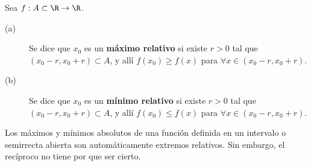 \begin{fdefinition}
\normalfont Sea $\displaystyle f : A \subset \R \to \R $. 
\begin{description}
\item[(a)] Se dice que $\displaystyle x_{0} $ es un \textbf{máximo relativo} si existe $\displaystyle r > 0 $ tal que $\displaystyle \left(x_{0}-r, x_{0}+r\right) \subset A $, y allí $\displaystyle f\left(x_{0}\right) \geq f\left(x\right) $ para $\displaystyle \forall x \in \left(x_{0}-r, x_{0}+r\right) $.
\item[(b)] Se dice que $\displaystyle x_{0} $ es un \textbf{mínimo relativo} si existe $\displaystyle r > 0 $ tal que $\displaystyle \left(x_{0}-r, x_{0}+r\right) \subset A $, y allí $\displaystyle f\left(x_{0}\right) \leq f\left(x\right) $ para $\displaystyle \forall x \in \left(x_{0}-r, x_{0}+r\right) $.
\end{description}
\end{fdefinition}
\begin{observation}
\normalfont Los máximos y mínimos absolutos de una función definida en un intervalo o semirrecta abierta son automáticamente extremos relativos. Sin embargo, el recíproco no tiene por que ser cierto.
\end{observation}

